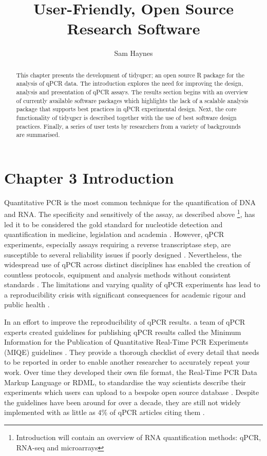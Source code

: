 \documentclass{SBCbookchapter}
\author{Sam Haynes}
\title{User-Friendly, Open Source Research Software}
\begin{document}
\maketitle

\begin{abstract}
This chapter presents the development of tidyqpcr; an open source R package for the analysis of qPCR data.
The introduction explores the need for improving the design, analysis and presentation of qPCR assays.
The results section begins with an overview of currently available software packages which highlights the lack of a scalable analysis package that supports best practices in qPCR experimental design.
Next, the core functionality of tidyqpcr is described together with the use of best software design practices.
Finally, a series of user tests by researchers from a variety of backgrounds are summarised.

\end{abstract}

\section{Chapter 3 Introduction}

Quantitative PCR is the most common technique for the quantification of DNA and RNA. 
The specificity and sensitively of the assay, as described above \footnote{Introduction will contain an overview of RNA quantification methods: qPCR, RNA-seq and microarrays}, has led it to be considered the gold standard for nucleotide detection and quantification in medicine, legislation and academia \cite{Kubista2006}.
However, qPCR experiments, especially assays requiring a reverse transcriptase step, are susceptible to several reliability issues if poorly designed \cite{Bustin2002}.
Nevertheless, the widespread use of qPCR across distinct disciplines has enabled the creation of countless protocols, equipment and analysis methods without consistent standards \cite{Bustin2021}.
The limitations and varying quality of qPCR experiments has lead to a reproducibility crisis with significant consequences for academic rigour \cite{Garson2009} and public health \cite{Bustin2013}. 

In an effort to improve the reproducibility of qPCR results. a team of qPCR experts created guidelines for publishing qPCR results called the Minimum Information for the Publication of Quantitative Real-Time PCR Experiments (MIQE) guidelines \cite{Bustin2009}.
They provide a thorough checklist of every detail that needs to be reported in order to enable another researcher to accurately repeat your work. 
Over time they developed their own file format, the Real-Time PCR Data Markup Language or RDML, to standardise the way scientists describe their experiments which users can upload to a bespoke open source database \cite{Lefever2009, Ruijter2015}.
Despite the guidelines have been around for over a decade, they are still not widely implemented with as little as $4\%$ of qPCR articles citing them \cite{AbdelNour2020}. 
\end{document}
